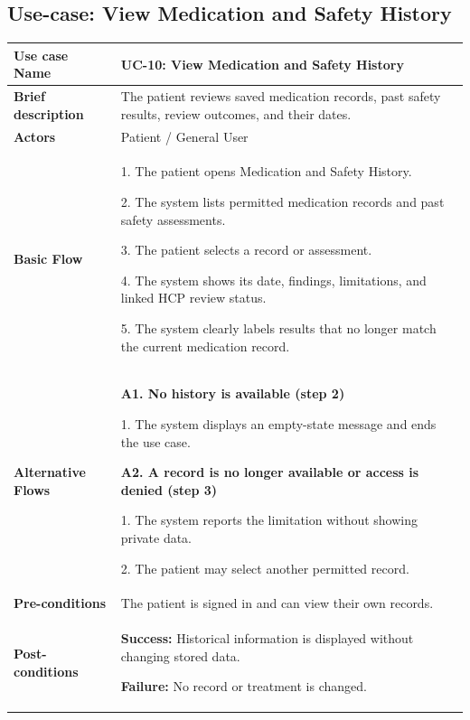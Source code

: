 \subsection{Use-case: View Medication and Safety History}
\label{uc:uc-10}
\begin{longtable}{|p{}|p{}|}
\hline
\textbf{Use case Name} & UC-10: View Medication and Safety History \\ \hline
\textbf{Brief description} & The patient reviews saved medication records, past safety results, review outcomes, and their dates. \\ \hline
\textbf{Actors} & Patient / General User \\ \hline
\textbf{Basic Flow} &
1. The patient opens Medication and Safety History.\par
2. The system lists permitted medication records and past safety assessments.\par
3. The patient selects a record or assessment.\par
4. The system shows its date, findings, limitations, and linked HCP review status.\par
5. The system clearly labels results that no longer match the current medication record.
\\ \hline
\textbf{Alternative Flows} &
\textbf{A1. No history is available (step 2)}\par
1. The system displays an empty-state message and ends the use case.
\par\smallskip
\textbf{A2. A record is no longer available or access is denied (step 3)}\par
1. The system reports the limitation without showing private data.\par
2. The patient may select another permitted record.
\\ \hline
\textbf{Pre-conditions} & The patient is signed in and can view their own records. \\ \hline
\textbf{Post-conditions} & \textbf{Success:} Historical information is displayed without changing stored data.\par
\textbf{Failure:} No record or treatment is changed. \\ \hline
\end{longtable}


\clearpage
